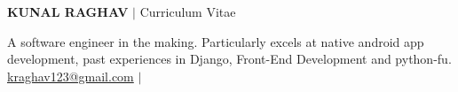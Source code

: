 \documentclass[10pt,a4paper]{extarticle}
\begin{document}
\noindent
	\begin{flushleft}
	\begin{LARGE}
		{
		\color{resumeBlueLight}
			\bfseries{ KUNAL RAGHAV} 
		}$|$ {\color{gray}Curriculum Vitae}\\					
	\end{LARGE}
		\vspace{2.5mm}
		A software engineer in the making. Particularly excels at native android app development, past
		experiences in Django, Front-End Development and python-fu.\\
		\vspace{2.5mm}
		\href{mailto:kraghav123@gmail.com}{ kraghav123@gmail.com}  $\mid$  

\end{flushleft}
\end{document}
